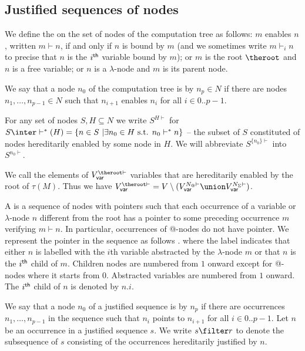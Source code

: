\subsection{Justified sequences of nodes}

We define the  on the set of nodes of the computation tree as follows: $m$ enables $n$, written $m \vdash n$, if and only if $n$ is bound by $m$ (and we sometimes write $m \vdash_i n$ to precise that $n$ is the $i^{\sf th}$ variable bound by $m$); or $m$ is the root $\theroot$ and $n$ is a free variable; or $n$ is a $\lambda$-node and $m$ is its parent node.


We say that a node $n_0$ of the computation tree is
 by $n_p \in N$ if there are nodes
$n_1,\ldots, n_{p-1} \in N$ such that $n_{i+1}$ enables $n_{i}$ for all $i\in 0..p-1$.

For any set of nodes $S, H \subseteq N$ we write $S^{H\vdash}$ for $S \inter \vdash^*(H) = \{ n \in S \ | \exists n_0 \in H \mbox{ s.t. }n_0  \vdash^* n \}$ -- the subset of $S$ constituted of nodes hereditarily enabled by some node in $H$. We will abbreviate $S^{\{n_0\}\vdash}$ into $S^{n_0\vdash}$.

We call  the elements of $V_{\sf var}^{\theroot\vdash}$ \ie variables that are hereditarily enabled by the root of $\tau(M)$. Thus we have $V_{\sf var}^{\theroot\vdash} = V \setminus ( V_{\sf var}^{N_@\vdash} \union V_{\sf var}^{N_\Sigma\vdash})$.

A  is a sequence of nodes with pointers such that each occurrence of a variable or $\lambda$-node $n$ different from the root has a pointer to some preceding occurrence $m$ verifying $m \vdash n$. In particular, occurrences of @-nodes do not have pointer. We represent the pointer in the sequence as follows .
 where the label indicates that either $n$ is labelled with the $i$th variable
abstracted by the $\lambda$-node $m$ or that $n$ is the $i^{\sf th}$ child of $m$.  Children nodes are numbered from $1$ onward except for @-nodes where it starts from $0$. Abstracted variables are numbered from $1$ onward. The $i^{\sf th}$ child of $n$ is denoted by $n.i$.

We say that a node $n_0$ of a justified sequence is
 by $n_p$ if there are occurrences $n_1,
\ldots, n_{p-1}$ in the sequence such that $n_i$ points to $n_{i+1}$ for all $i\in 0..p-1$. Let $n$ be an occurrence in a justified sequence $s$. We write $s \filter r$ to denote the subsequence of $s$ consisting of the occurrences hereditarily justified by $n$.


